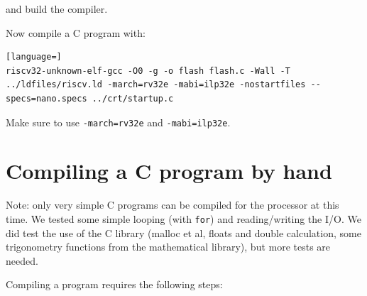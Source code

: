 \documentclass[12pt]{article}
\begin{document}
and build the compiler.

Now compile a C program with:

\begin{lstlisting}[language=]
riscv32-unknown-elf-gcc -O0 -g -o flash flash.c -Wall -T ../ldfiles/riscv.ld -march=rv32e -mabi=ilp32e -nostartfiles --specs=nano.specs ../crt/startup.c
\end{lstlisting}

Make sure to use \texttt{-march=rv32e} and \texttt{-mabi=ilp32e}.


\section{Compiling a C program by hand}
Note: only very simple C programs can be compiled for the processor at this time. We tested some simple looping (with \texttt{for}) and reading/writing the I/O. We did test the use of the C library (malloc et al, floats and double calculation, some trigonometry  functions from the mathematical library), but more tests are needed.

Compiling a program requires the following steps:
\end{document}
